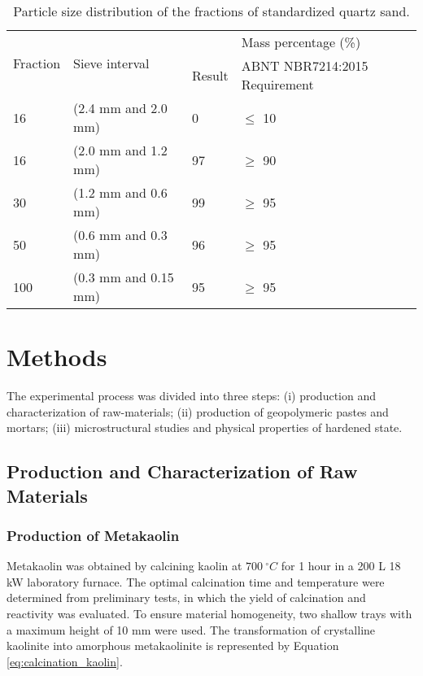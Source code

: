 \begin{table}[H]
    \caption{Particle size distribution of the fractions of standardized quartz sand.}
    \label{tab:quartz_sand_granulometry}
    \centering
    \begin{tabular}{p{} p{} p{} p{}}
        \hline
        \multirow{2}{*}{Fraction} & \multirow{2}{*}{Sieve interval} & \multicolumn{2}{c}{Mass percentage (\%)} \\ \cline{3-4}       
        & & Result & ABNT NBR7214:2015 Requirement\\
        \hline
        16 & (2.4 mm and 2.0 mm) & 0 & $\leq$ 10 \\
        16 & (2.0 mm and 1.2 mm) & 97 & $\geq$ 90 \\
        30 & (1.2 mm and 0.6 mm) & 99 & $\geq$ 95 \\
        50 & (0.6 mm and 0.3 mm) & 96 & $\geq$ 95 \\
        100 & (0.3 mm and 0.15 mm) & 95 & $\geq$ 95 \\
        \hline
    \end{tabular}
\end{table}

\section{Methods}
\label{sec:methods}
The experimental process was divided into three steps: (i) production and characterization of raw-materials; (ii) production of geopolymeric pastes and mortars; (iii) microstructural studies and physical properties of hardened state.

\subsection{Production and Characterization of Raw Materials}
\label{sec:production_characterization_raw_materials}

\subsubsection{Production of Metakaolin}
\label{sec:production_of_metakaolin}

Metakaolin was obtained by calcining kaolin at $700\ ^\circ C$ for 1 hour in a 200 L 18 kW laboratory furnace.
The optimal calcination time and temperature were determined from preliminary tests, in which the yield of calcination and reactivity was evaluated.
To ensure material homogeneity, two shallow trays with a maximum height of 10 mm were used.
The transformation of crystalline kaolinite into amorphous metakaolinite is represented by Equation \ref{eq:calcination_kaolin}.

